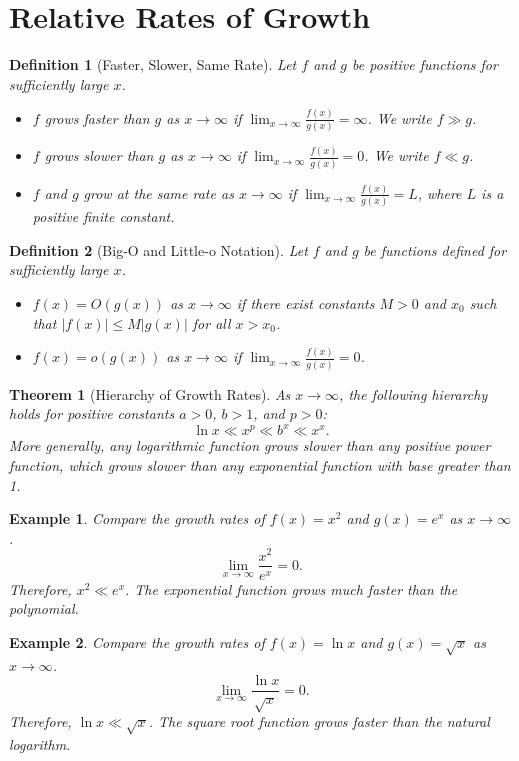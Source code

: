 \documentclass[11pt,a4paper]{article}
\newtheorem{example}{Example}
\newtheorem{theorem}{Theorem}
\newtheorem{definition}{Definition}
\begin{document}
\section{Relative Rates of Growth}
\begin{definition}[Faster, Slower, Same Rate]
Let $f$ and $g$ be positive functions for sufficiently large $x$.
\begin{itemize}
\item $f$ \textit{grows faster} than $g$ as $x \to \infty$ if $\displaystyle \lim_{x \to \infty} \frac{f(x)}{g(x)} = \infty$. We write $f \gg g$.
\item $f$ \textit{grows slower} than $g$ as $x \to \infty$ if $\displaystyle \lim_{x \to \infty} \frac{f(x)}{g(x)} = 0$. We write $f \ll g$.
\item $f$ and $g$ \textit{grow at the same rate} as $x \to \infty$ if $\displaystyle \lim_{x \to \infty} \frac{f(x)}{g(x)} = L$, where $L$ is a positive finite constant.
\end{itemize}
\end{definition}
\begin{definition}[Big-O and Little-o Notation]
Let $f$ and $g$ be functions defined for sufficiently large $x$.
\begin{itemize}
\item $f(x) = O(g(x))$ as $x \to \infty$ if there exist constants $M > 0$ and $x_0$ such that $|f(x)| \leq M |g(x)|$ for all $x > x_0$.
\item $f(x) = o(g(x))$ as $x \to \infty$ if $\displaystyle \lim_{x \to \infty} \frac{f(x)}{g(x)} = 0$.
\end{itemize}
\end{definition}
\begin{theorem}[Hierarchy of Growth Rates]
As $x \to \infty$, the following hierarchy holds for positive constants $a > 0$, $b > 1$, and $p > 0$:
\[
\ln x \ll x^p \ll b^x \ll x^x.
\]
More generally, any logarithmic function grows slower than any positive power function, which grows slower than any exponential function with base greater than 1.
\end{theorem}
\begin{example}
Compare the growth rates of $f(x) = x^2$ and $g(x) = e^x$ as $x \to \infty$.
\[
\lim_{x \to \infty} \frac{x^2}{e^x} = 0.
\]
Therefore, $x^2 \ll e^x$. The exponential function grows much faster than the polynomial.
\end{example}
\begin{example}
Compare the growth rates of $f(x) = \ln x$ and $g(x) = \sqrt{x}$ as $x \to \infty$.
\[
\lim_{x \to \infty} \frac{\ln x}{\sqrt{x}} = 0.
\]
Therefore, $\ln x \ll \sqrt{x}$. The square root function grows faster than the natural logarithm.
\end{example}
\end{document}
